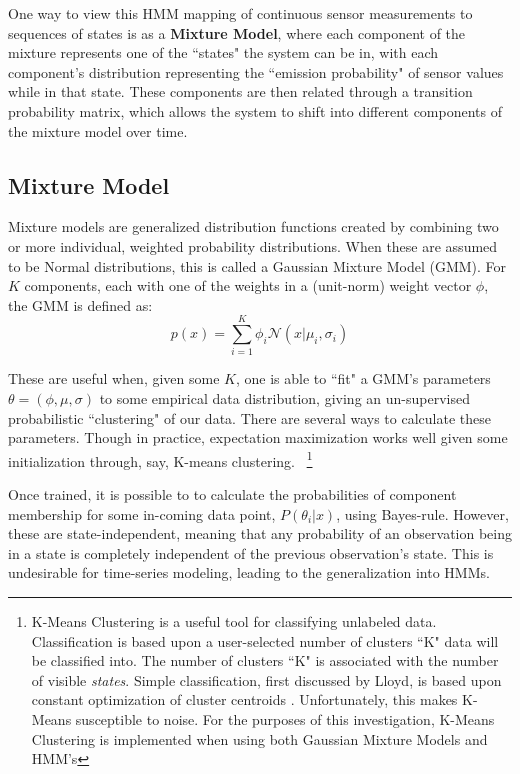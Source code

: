 \documentclass[twocolumn,10pt]{article}
\begin{document}
One way to view this HMM mapping of continuous sensor measurements to sequences of states is as a \textbf{Mixture Model}, where each component of the mixture represents one of the ``states" the system can be in, with each component's distribution representing the ``emission probability" of sensor values while in that state. These components are then related through a transition probability matrix, which allows the system to shift into different components of the mixture model over time. 

\subsection{Mixture Model}\label{sec:gmm}
Mixture models are generalized distribution functions created by combining two or more individual, weighted probability distributions. When these are assumed to be Normal distributions, this is called a Gaussian Mixture Model (GMM). For $K$ components, each with one of the weights in a (unit-norm) weight vector $\phi$, the GMM is defined as:
\begin{equation}\label{gmm}
    p(x) = \sum_{i=1}^{K} \phi_i\mathcal{N}(x|\mu_i, \sigma_i)
\end{equation}

These are useful when, given some $K$, one is able to ``fit" a GMM's parameters $\theta=(\phi, \mu, \sigma)$ to some empirical data distribution, giving an un-supervised probabilistic ``clustering" of our data. There are several ways to calculate these parameters. Though in practice, expectation maximization works well given some initialization through, say, K-means clustering.~\citep{GMMfit} 
\footnote{K-Means Clustering is a useful tool for classifying unlabeled data. Classification is based upon a user-selected number of clusters ``K" data will be classified into. The number of clusters ``K" is associated with the number of visible \textit{states}. Simple classification, first discussed by Lloyd, is based upon constant optimization of cluster centroids \cite{pcm} . Unfortunately, this makes K-Means susceptible to noise. For the purposes of this investigation, K-Means Clustering is implemented when using both Gaussian Mixture Models and HMM's}

Once trained, it is possible to to calculate the probabilities of component membership for some in-coming data point, $P(\theta_i|x)$,  using Bayes-rule. However, these are state-independent, meaning that any probability of an observation being in a state is completely independent of the previous observation's state. This is undesirable for time-series modeling, leading to the generalization into HMMs.
\end{document}
